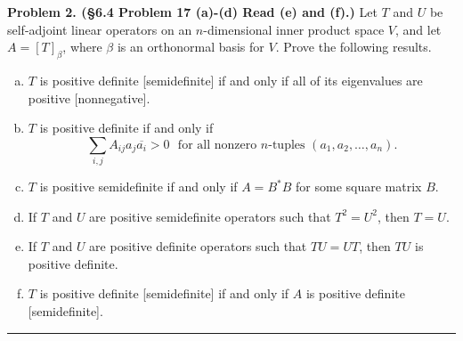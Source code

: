 \documentclass[leqno]{article}
\theoremstyle{nonumberplain}
\begin{document}
\noindent\textbf{Problem 2. (\S 6.4 Problem 17 (a)-(d) Read (e) and (f).)} Let $T$ and $U$ be self-adjoint linear operators on an $n$-dimensional inner product space $V$, and let $A=[T]_\beta$, where $\beta$ is an orthonormal basis for $V$. Prove the following results.
\begin{enumerate}[(a)]
\item $T$ is positive definite [semidefinite] if and only if all of its eigenvalues are positive [nonnegative].
\item $T$ is positive definite if and only if 
\[
\sum_{i,j}A_{ij}a_j \overline{a_i} > 0 \textrm{~ for all nonzero $n$-tuples $(a_1,a_2,\dots,a_n)$.}
\]
\item $T$ is positive semidefinite if and only if $A=B^*B$ for some square matrix $B$.
\item If $T$ and $U$ are positive semidefinite operators such that $T^2=U^2$, then $T=U$.
\item If $T$ and $U$ are positive definite operators such that $TU=UT$, then $TU$ is positive definite.
\item $T$ is positive definite [semidefinite] if and only if $A$ is positive definite [semidefinite].
\end{enumerate}

\noindent\rule[0.5ex]{\linewidth}{1pt}
\end{document}
